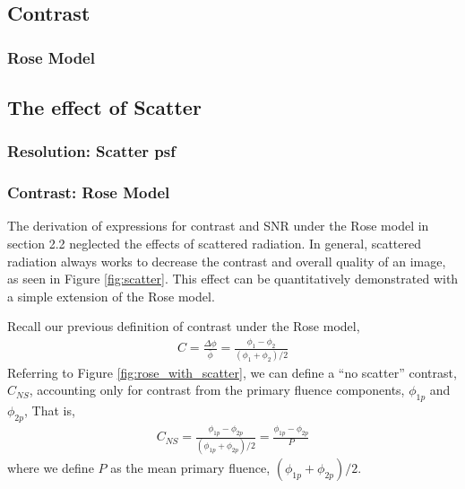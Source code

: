 \documentclass[mphy386-notes.tex]{subfiles}
\begin{document}
\subsection{Contrast}
\subsubsection{Rose Model}
\subsection{The effect of Scatter}
\subsubsection{Resolution: Scatter psf}
\subsubsection{Contrast: Rose Model}


The derivation of expressions for contrast and SNR under the Rose model in
section 2.2 neglected the effects of scattered radiation. In general,
scattered radiation always works to decrease the contrast and overall
quality of an image, as seen in Figure \ref{fig:scatter}.
This effect can be quantitatively demonstrated with a simple extension
of the Rose model. 


Recall our previous definition of contrast under the Rose model,
\begin{align}
  C = \frac{\Delta \phi}{\bar{\phi}} = \frac{\phi_1 - \phi_2}{(\phi_1 + \phi_2)/2}
\end{align}
Referring to Figure \ref{fig:rose_with_scatter}, we can define a
``no scatter'' contrast, $C_{NS}$, accounting only for contrast from
the primary fluence components, $\phi_{1p}$ and $\phi_{2p}$, That is,
\begin{align}
  C_{NS} = \frac{\phi_{1p} - \phi_{2p}}{(\phi_{1p} + \phi_{2p})/2} = \frac{\phi_{1p} - \phi_{2p}}{P}
\end{align}
where we define $P$ as the mean primary fluence, $(\phi_{1p} + \phi_{2p})/2$.
\end{document}
